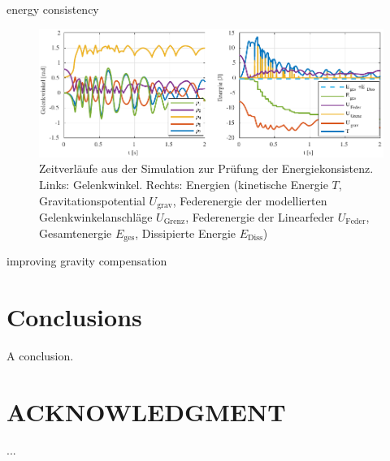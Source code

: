 \documentclass[letterpaper, 10 pt, conference]{ieeeconf}  %
\begin{document}
energy consistency

\begin{figure}[tb!]
    \includegraphics{figures/KAS5m5_Gelenkgrenzmodell_q_E.pdf} 
    \caption[Zeitverläufe aus der Simulation zur Prüfung der Energiekonsistenz]{Zeitverläufe aus der Simulation zur Prüfung der Energiekonsistenz. Links: Gelenkwinkel. Rechts: Energien (kinetische Energie $T$, Gravitationspotential $U_\mathrm{grav}$, Federenergie der modellierten Gelenkwinkelanschläge $U_\mathrm{Grenz}$, Federenergie der Linearfeder $U_\mathrm{Feder}$, Gesamtenergie $E_\mathrm{ges}$, Dissipierte Energie $E_\mathrm{Diss}$)}
    \label{fig:SimulationEnergiekonsistenz}
\end{figure} 


improving gravity compensation

\section{Conclusions}

A conclusion.

\addtolength{\textheight}{-12cm}   %







%


\section*{ACKNOWLEDGMENT}

...






\end{document}
